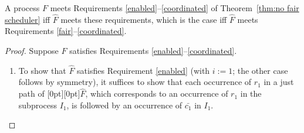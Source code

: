 \documentclass[smallcondensed]{svjour3}
\newcommand{\plat}[1]{\raisebox{0pt}[0pt][0pt]{#1}}  \def\precond#1{{\vphantom{#1}}^\bullet #1}
\newcommand{\Thm}[1]{Theorem~\ref{thm:#1}}
\begin{document}
\begin{theorem}\rm\label{thm:no fair scheduler2}
A process $F$ meets Requirements \ref{enabled}--\ref{coordinated} of \Thm{no fair scheduler} iff
$\widehat F$ meets these requirements, which is the case iff
$\widehat F$ meets Requirements \ref{fair}--\ref{coordinated}.
\end{theorem}
\begin{proof}
Suppose $F$ satisfies Requirements \ref{enabled}--\ref{coordinated}.
\begin{enumerate}
\item To show that $\widehat F$ satisfies Requirement \ref{enabled} (with $i\mathbin{:=}1$; the other case
  follows by symmetry), it suffices to show that each occurrence of $r_1$ in a just path of
  \plat{$\widehat F$}, which corresponds to an occurrence of $r_1$ in the subprocess $I_1$, is followed by
  an occurrence of $\bar{c_1}$ in $I_1$.


\end{enumerate}
\end{proof}
\end{document}
